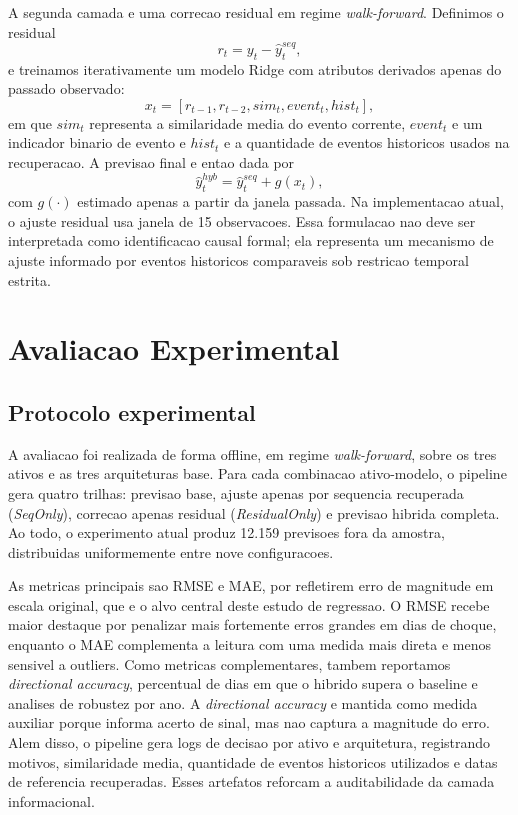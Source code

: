 \documentclass[12pt]{article}
\begin{document}
A segunda camada e uma correcao residual em regime \textit{walk-forward}. Definimos o residual
\[
r_t = y_t - \hat{y}^{seq}_{t},
\]
e treinamos iterativamente um modelo Ridge com atributos derivados apenas do passado observado:
\[
x_t = [r_{t-1}, r_{t-2}, sim_t, event_t, hist_t],
\]
em que $sim_t$ representa a similaridade media do evento corrente, $event_t$ e um indicador binario de evento e $hist_t$ e a quantidade de eventos historicos usados na recuperacao. A previsao final e entao dada por
\[
\hat{y}^{hyb}_{t} = \hat{y}^{seq}_{t} + g(x_t),
\]
com $g(\cdot)$ estimado apenas a partir da janela passada. Na implementacao atual, o ajuste residual usa janela de 15 observacoes. Essa formulacao nao deve ser interpretada como identificacao causal formal; ela representa um mecanismo de ajuste informado por eventos historicos comparaveis sob restricao temporal estrita.

\section{Avaliacao Experimental}

\subsection{Protocolo experimental}

A avaliacao foi realizada de forma offline, em regime \textit{walk-forward}, sobre os tres ativos e as tres arquiteturas base. Para cada combinacao ativo-modelo, o pipeline gera quatro trilhas: previsao base, ajuste apenas por sequencia recuperada (\textit{SeqOnly}), correcao apenas residual (\textit{ResidualOnly}) e previsao hibrida completa. Ao todo, o experimento atual produz 12.159 previsoes fora da amostra, distribuidas uniformemente entre nove configuracoes.

As metricas principais sao RMSE e MAE, por refletirem erro de magnitude em escala original, que e o alvo central deste estudo de regressao. O RMSE recebe maior destaque por penalizar mais fortemente erros grandes em dias de choque, enquanto o MAE complementa a leitura com uma medida mais direta e menos sensivel a outliers. Como metricas complementares, tambem reportamos \textit{directional accuracy}, percentual de dias em que o hibrido supera o baseline e analises de robustez por ano. A \textit{directional accuracy} e mantida como medida auxiliar porque informa acerto de sinal, mas nao captura a magnitude do erro. Alem disso, o pipeline gera logs de decisao por ativo e arquitetura, registrando motivos, similaridade media, quantidade de eventos historicos utilizados e datas de referencia recuperadas. Esses artefatos reforcam a auditabilidade da camada informacional.
\end{document}
